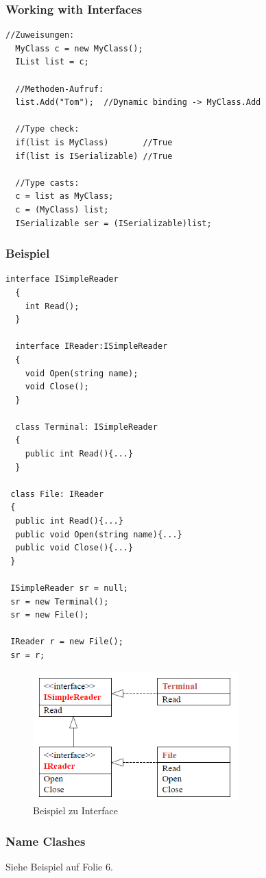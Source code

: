 \subsubsection{Working with Interfaces}
\begin{lstlisting}[style=Csharp]
  //Zuweisungen: 
  MyClass c = new MyClass(); 
  IList list = c; 
  
  //Methoden-Aufruf:
  list.Add("Tom");  //Dynamic binding -> MyClass.Add
  
  //Type check:
  if(list is MyClass)       //True
  if(list is ISerializable) //True
  
  //Type casts: 
  c = list as MyClass; 
  c = (MyClass) list; 
  ISerializable ser = (ISerializable)list;
\end{lstlisting}

\subsubsection{Beispiel}
\begin{lstlisting}[style=Csharp]
  interface ISimpleReader
  {
    int Read();  
  }
  
  interface IReader:ISimpleReader
  {
    void Open(string name); 
    void Close(); 
  }
  
  class Terminal: ISimpleReader
  {
    public int Read(){...}
  }
 
 class File: IReader
 {
  public int Read(){...}
  public void Open(string name){...}
  public void Close(){...}
 }
 
 ISimpleReader sr = null; 
 sr = new Terminal(); 
 sr = new File(); 
 
 IReader r = new File(); 
 sr = r; 
\end{lstlisting}
\begin{figure}[h]
  \centering
  \includegraphics[height=5cm, ]{images/CSharp/InterfaceExample}
  \caption{Beispiel zu Interface} 
\end{figure}

\subsubsection{Name Clashes}
Siehe Beispiel auf Folie 6. 